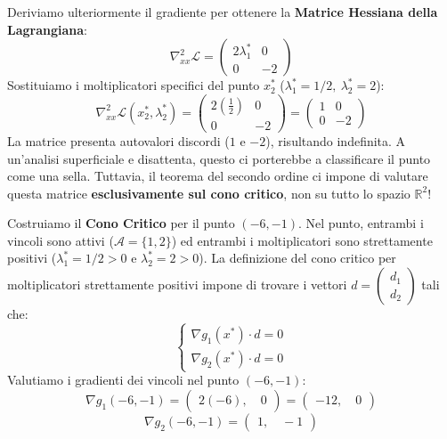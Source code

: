 \documentclass[12pt, a4paper]{article}
\begin{document}
	Deriviamo ulteriormente il gradiente per ottenere la \textbf{Matrice Hessiana della Lagrangiana}:
	\[ \nabla_{xx}^2 \mathcal{L} = \begin{pmatrix} 2\lambda^*_1 & 0 \\ 0 & -2 \end{pmatrix} \]
	Sostituiamo i moltiplicatori specifici del punto $x^*_2$ ($\lambda^*_1 = 1/2, \ \lambda^*_2 = 2$):
	\[ \nabla_{xx}^2 \mathcal{L} \left( x^*_2, \lambda^*_2 \right) = \begin{pmatrix} 2(\frac{1}{2}) & 0 \\ 0 & -2 \end{pmatrix} = \begin{pmatrix} 1 & 0 \\ 0 & -2 \end{pmatrix} \]
	La matrice presenta autovalori discordi ($1$ e $-2$), risultando indefinita. A un'analisi superficiale e disattenta, questo ci porterebbe a classificare il punto come una sella. Tuttavia, il teorema del secondo ordine ci impone di valutare questa matrice \textbf{esclusivamente sul cono critico}, non su tutto lo spazio $\mathbb{R}^2$!
	
	Costruiamo il \textbf{Cono Critico} per il punto $(-6, -1)$. Nel punto, entrambi i vincoli sono attivi ($\mathcal{A} = \{1, 2\}$) ed entrambi i moltiplicatori sono strettamente positivi ($\lambda^*_1 = 1/2 > 0$ e $\lambda^*_2 = 2 > 0$). La definizione del cono critico per moltiplicatori strettamente positivi impone di trovare i vettori $d = \begin{pmatrix} d_1 \\ d_2 \end{pmatrix}$ tali che:
	\[
	\begin{cases}
		\nabla g_1(x^*) \cdot d = 0 \\
		\nabla g_2(x^*) \cdot d = 0
	\end{cases}
	\]
	Valutiamo i gradienti dei vincoli nel punto $(-6, -1)$:
	\[ \nabla g_1(-6, -1) = \begin{pmatrix} 2(-6), \quad 0 \end{pmatrix} = \begin{pmatrix} -12, \quad 0 \end{pmatrix} \]
	\[ \nabla g_2(-6, -1) = \begin{pmatrix} 1, \quad -1 \end{pmatrix} \]
	
\end{document}
